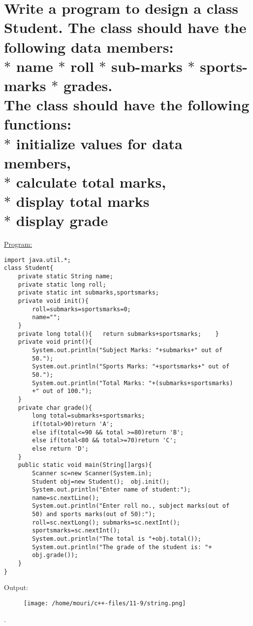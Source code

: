 \documentclass[a4paper,11pt]{article}
\begin{document}
\section{Write a program to design a class Student. The class should have the following data members:\\ $*$ name    $*$ roll		$*$ sub-marks	$*$ sports-marks	$*$ grades.\\The class should have the following functions:\\$*$ initialize values for data members,\\$*$ calculate total marks,\\$*$ display total marks\\$*$ display grade}
\underline{Program:}
\begin{lstlisting}[showstringspaces=false]
import java.util.*;
class Student{
	private static String name;
	private static long roll;
	private static int submarks,sportsmarks;
	private void init(){
		roll=submarks=sportsmarks=0;
		name="";
	}
	private long total(){	return submarks+sportsmarks;	}
	private void print(){
		System.out.println("Subject Marks: "+submarks+" out of 
		50.");
		System.out.println("Sports Marks: "+sportsmarks+" out of 
		50.");
		System.out.println("Total Marks: "+(submarks+sportsmarks)
		+" out of 100.");
	}
	private char grade(){
		long total=submarks+sportsmarks;
		if(total>90)return 'A';
		else if(total<=90 && total >=80)return 'B';
		else if(total<80 && total>=70)return 'C';
		else return 'D';
	}
	public static void main(String[]args){
		Scanner sc=new Scanner(System.in);
		Student obj=new Student();  obj.init();
		System.out.println("Enter name of student:");
		name=sc.nextLine();
		System.out.println("Enter roll no., subject marks(out of 
		50) and sports marks(out of 50):");
		roll=sc.nextLong();	submarks=sc.nextInt();
		sportsmarks=sc.nextInt();
		System.out.println("The total is "+obj.total());
		System.out.println("The grade of the student is: "+
		obj.grade());
	}
}
\end{lstlisting}
Output:
\begin{figure}[H]
\centering
\texttt{[image: /home/mouri/c++-files/11-9/string.png]}
\end{figure}
.
\end{document}
